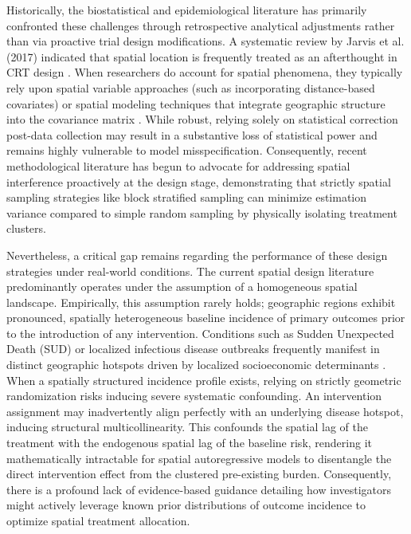 \documentclass[11pt]{article}
\begin{document}
Historically, the biostatistical and epidemiological literature has primarily confronted these challenges through retrospective analytical adjustments rather than via proactive trial design modifications. A systematic review by Jarvis et al. (2017) indicated that spatial location is frequently treated as an afterthought in CRT design \cite{jarvis_spatial_2017}. When researchers do account for spatial phenomena, they typically rely upon spatial variable approaches (such as incorporating distance-based covariates) \cite{hawley_community-wide_2003, lenhart_insecticidetreated_2008, chao_contribution_2015} or spatial modeling techniques that integrate geographic structure into the covariance matrix \cite{alexander_spatial_2003, silcocks_spatial_2010}. While robust, relying solely on statistical correction post-data collection may result in a substantive loss of statistical power and remains highly vulnerable to model misspecification. Consequently, recent methodological literature has begun to advocate for addressing spatial interference proactively at the design stage, demonstrating that strictly spatial sampling strategies like block stratified sampling can minimize estimation variance compared to simple random sampling by physically isolating treatment clusters.

Nevertheless, a critical gap remains regarding the performance of these design strategies under real-world conditions. The current spatial design literature predominantly operates under the assumption of a homogeneous spatial landscape. Empirically, this assumption rarely holds; geographic regions exhibit pronounced, spatially heterogeneous baseline incidence of primary outcomes prior to the introduction of any intervention. Conditions such as Sudden Unexpected Death (SUD) or localized infectious disease outbreaks frequently manifest in distinct geographic hotspots driven by localized socioeconomic determinants \cite{mirzaei_years_2019}. When a spatially structured incidence profile exists, relying on strictly geometric randomization risks inducing severe systematic confounding. An intervention assignment may inadvertently align perfectly with an underlying disease hotspot, inducing structural multicollinearity. This confounds the spatial lag of the treatment with the endogenous spatial lag of the baseline risk, rendering it mathematically intractable for spatial autoregressive models to disentangle the direct intervention effect from the clustered pre-existing burden. Consequently, there is a profound lack of evidence-based guidance detailing how investigators might actively leverage known prior distributions of outcome incidence to optimize spatial treatment allocation.
\end{document}
